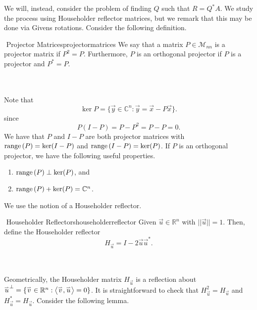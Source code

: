         We will, instead, consider the problem of finding \(Q\) such that \(R=Q^*A\). We study the process using Householder reflector matrices, but we remark that this may be done via Givens rotations.
        Consider the following definition.
        \begin{definition}{\Stop\,\,Projector Matrices}{projectormatrices}
            We say that a matrix \(P\in\mathcal{M}_{nn}\) is a projector matrix if \(P^2=P\). Furthermore, \(P\) is an orthogonal projector if \(P\) is a projector and \(P^*=P\).
        \end{definition}
        \vphantom
        \\
        \\
        Note that
        \begin{equation*}
            \ker P=\{\vec{y}\in\mathbb{C}^n:\vec{y}=\vec{x}-P\vec{x}\}.
        \end{equation*}
        since
        \begin{equation*}
            P(I-P)=P-P^2=P-P=0.
        \end{equation*}
        \pagebreak
        We have that \(P\) and \(I-P\) are both projector matrices with \(\text{range\,}(P)=\ker(I-P)\) and \(\text{range\,}(I-P)=\ker(P)\). If \(P\) is an orthogonal projector, we have the following useful properties.
        \begin{enumerate}
            \item \(\text{range\,}(P)\perp \ker(P)\), and
            \item \(\text{range\,}(P)+\ker(P)=\mathbb{C}^n\).
        \end{enumerate}
        We use the notion of a Householder reflector.
        \begin{definition}{\Stop\,\,Householder Reflectors}{householderreflector}
            Given \(\vec{u}\in \mathbb{R}^n\) with \(||\vec{u}||=1\). Then, define the Householder reflector
            \begin{equation*}
                H_{\vec{u}}=I-2\vec{u}\vec{u}^*.
            \end{equation*}
        \end{definition}
        \vphantom
        \\
        \\
        Geometrically, the Householder matrix \(H_{\vec{u}}\) is a reflection about \(\overset{_{\rightharpoonup}}{u}^\perp=\{\overset{_{\rightharpoonup}}{v}\in\mathbb{R}^n:\left\langle \overset{_{\rightharpoonup}}{v},\overset{_{\rightharpoonup}}{u}\right\rangle=0\}\). It is straightforward to check that \(H_{\vec{u}}^2=H_{\vec{u}}\) and \(H_{\vec{u}}^*=H_{\vec{u}}\). Consider the following lemma.
